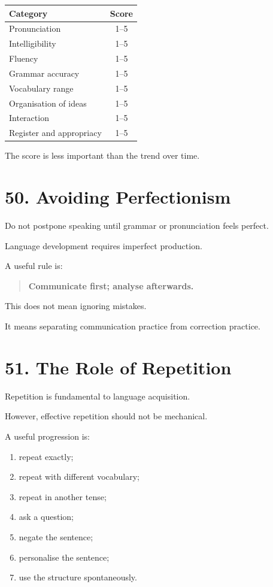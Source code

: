 \begin{center}
\begin{tabular}{|p{5cm}|c|}
\hline
\textbf{Category} & \textbf{Score} \\
\hline
Pronunciation & 1--5 \\
\hline
Intelligibility & 1--5 \\
\hline
Fluency & 1--5 \\
\hline
Grammar accuracy & 1--5 \\
\hline
Vocabulary range & 1--5 \\
\hline
Organisation of ideas & 1--5 \\
\hline
Interaction & 1--5 \\
\hline
Register and appropriacy & 1--5 \\
\hline
\end{tabular}
\end{center}

The score is less important than the trend over time.

\section*{50. Avoiding Perfectionism}

Do not postpone speaking until grammar or pronunciation feels perfect.

Language development requires imperfect production.

A useful rule is:

\begin{quote}
\textbf{Communicate first; analyse afterwards.}
\end{quote}

This does not mean ignoring mistakes.

It means separating communication practice from correction practice.

\section*{51. The Role of Repetition}

Repetition is fundamental to language acquisition.

However, effective repetition should not be mechanical.

A useful progression is:

\begin{enumerate}
    \item repeat exactly;
    \item repeat with different vocabulary;
    \item repeat in another tense;
    \item ask a question;
    \item negate the sentence;
    \item personalise the sentence;
    \item use the structure spontaneously.
\end{enumerate}

